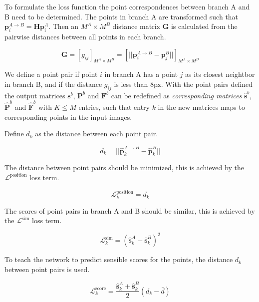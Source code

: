 To formulate the loss function the point correspondences between branch A and B need to be determined. The points in branch A are transformed such that $\textbf{p}_i^{A\rightarrow B}=\textbf{H}\textbf{p}_i^A$. Then an $M^A\times M^B$ distance matrix $\textbf{G}$ is calculated from the pairwise distances between all points in each branch.

\begin{equation}
\textbf{G}=[g_{ij}]_{M^A\times M^B}=\left[||\textbf{p}_i^{A\rightarrow B}-\textbf{p}_j^B||\right]_{M^A\times M^B}
\end{equation}

We define a point pair if point $i$ in branch A has a point $j$ as its closest neightbor in branch B, and if the distance $g_{ij}$ is less than 8px. With the point pairs defined the output matrices $\textbf{s}^b$, $\textbf{P}^b$ and $\textbf{F}^b$ can be redefined as \textit{corresponding matrices} $\hat{\textbf{s}}^b$, $\hat{\textbf{P}}^b$ and $\hat{\textbf{F}}^b$ with $K\le M$ entries, such that entry $k$ in the new matrices maps to corresponding points in the input images.

Define $d_k$ as the distance between each point pair.

\begin{equation}
d_k=||\hat{\textbf{p}}_k^{A\rightarrow B}-\hat{\textbf{p}}_k^B||
\end{equation}

The distance between point pairs should be minimized, this is achieved by the $\mathcal{L}^{\textrm{position}}$ loss term.

\begin{equation}
\mathcal{L}_k^{\textrm{position}} = d_k
\end{equation}

The scores of point pairs in branch A and B should be similar, this is achieved by the $\mathcal{L}^{\textrm{sim}}$ loss term.

\begin{equation}
\mathcal{L}_k^{\textrm{sim}} = \left(\hat{\textbf{s}}_k^{A}-\hat{\textbf{s}}_k^B\right)^2
\end{equation}

To teach the network to predict sensible scores for the points, the distance $d_k$ between point pairs is used.

\begin{equation}
\mathcal{L}_k^{\textrm{score}}=\frac{\hat{\textbf{s}}_k^A+\hat{\textbf{s}}_k^B}{2}\left(d_k-\bar{d}\right)
\end{equation}

